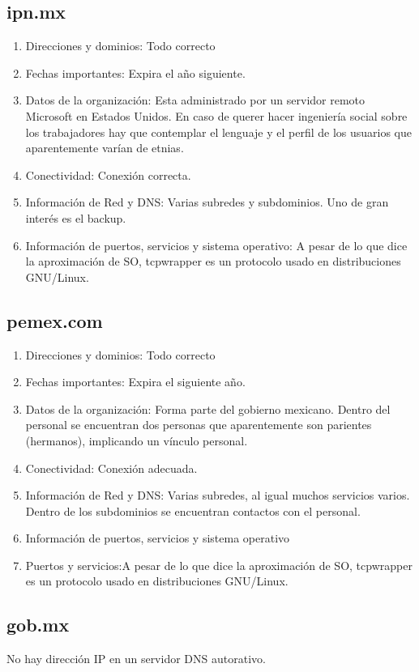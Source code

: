 \subsection{ipn.mx}
\begin{enumerate}

    \item Direcciones y dominios: Todo correcto
    \item Fechas importantes: Expira el año siguiente.
    \item Datos de la organización: Esta administrado por un servidor remoto Microsoft en Estados Unidos. En caso de querer hacer ingeniería social sobre los trabajadores hay que contemplar el lenguaje y el perfil de los usuarios que aparentemente varían de etnias.

    \item Conectividad: Conexión correcta.

    \item Información de Red y DNS: Varias subredes y subdominios. Uno de gran interés es el backup.
    \item Información de puertos, servicios y sistema operativo: A pesar de lo que dice la aproximación de SO, tcpwrapper es un protocolo usado en distribuciones GNU/Linux.

\end{enumerate}

\subsection{pemex.com}

\begin{enumerate}
    \item Direcciones y dominios: Todo correcto

    \item Fechas importantes: Expira el siguiente año.
    \item Datos de la organización: Forma parte del gobierno mexicano. Dentro del personal se encuentran dos personas que aparentemente son parientes (hermanos), implicando un vínculo personal.

    \item Conectividad: Conexión adecuada.

    \item Información de Red y DNS: Varias subredes, al igual muchos servicios varios. Dentro de los subdominios se encuentran contactos con el personal.

    \item Información de puertos, servicios y sistema operativo
        
    \item Puertos y servicios:A pesar de lo que dice la aproximación de SO, tcpwrapper es un protocolo usado en distribuciones GNU/Linux.

\end{enumerate}


\subsection{gob.mx}

No hay dirección IP en un servidor DNS autorativo.